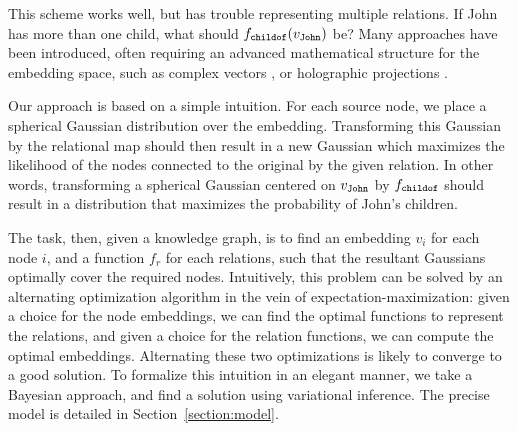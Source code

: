 \documentclass[11pt]{article}
\newcommand{\fw}[1]{\text{\texttt{#1}}}
\begin{document}
This scheme works well, but has trouble representing multiple relations. If John has more than one child, what should $f_\fw{childof}(v_\fw{John})$ be? Many approaches have been introduced, often requiring an advanced mathematical structure for the embedding space, such as complex vectors \cite{trouillon2016complex}, or holographic projections \cite{nickel2016holographic}.

Our approach is based on a simple intuition. For each source node, we place a spherical Gaussian distribution over the embedding. Transforming this Gaussian by the relational map should then result in a new Gaussian which maximizes the likelihood of the nodes connected to the original by the given relation.\footnotemark
{} In other words, transforming a spherical Gaussian centered on $v_\fw{John}$ by $f_\fw{childof}$ should result in a distribution that maximizes the probability of John's children.

The task, then, given a knowledge graph, is to find an embedding $v_i$ for each node $i$, and a function $f_r$ for each relations, such that the resultant Gaussians optimally cover the required nodes. Intuitively, this problem can be solved by an alternating optimization algorithm in the vein of expectation-maximization: given a choice for the node embeddings, we can find the optimal functions to represent the relations, and given a choice for the relation functions, we can compute the optimal embeddings. Alternating these two optimizations is likely to converge to a good solution. To formalize this intuition in an elegant manner, we take a Bayesian approach, and find a solution using variational inference. The precise model is detailed in Section~\ref{section:model}.
\end{document}
